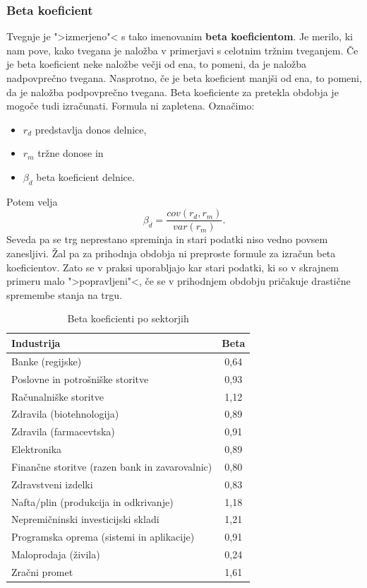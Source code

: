 \documentclass[12pt,a4paper]{amsart}
\theoremstyle{definition} %
\theoremstyle{plain} %
\begin{document}
\subsubsection{Beta koeficient}
Tvegnje je ">izmerjeno"< s tako imenovanim \textbf{beta koeficientom}. Je merilo, ki nam pove,
kako tvegana je naložba v primerjavi s celotnim tržnim tveganjem. Če je beta koeficient neke naložbe
večji od ena, to pomeni, da je naložba nadpovprečno tvegana. Nasprotno, če je beta koeficient 
manjši od ena, to pomeni, da je naložba podpovprečno tvegana. Beta koeficiente za pretekla 
obdobja je mogoče tudi izračunati. Formula ni zapletena. Označimo:
\begin{itemize}
  \item $r_d$ predstavlja donos delnice,
  \item $r_m$ tržne donose in
  \item $\beta_d$ beta koeficient delnice.
\end{itemize}
Potem velja 
$$\beta_d = \frac{cov(r_d, r_m)}{var(r_m)}.$$
Seveda pa se trg neprestano spreminja in stari podatki niso vedno povsem zanesljivi. Žal pa
za prihodnja obdobja ni preproste formule za izračun beta koeficientov. Zato se v praksi 
uporabljajo kar stari podatki, ki so v skrajnem primeru malo ">popravljeni"<, če se v prihodnjem
obdobju pričakuje drastične spremembe stanja na trgu.

\begin{table}[h]
\begin{tabular}{l|c}
\textbf{Industrija}                       & \textbf{Beta} \\ \hline
Banke (regijske)                               & 0,64 \\
Poslovne in potrošniške storitve               & 0,93 \\
Računalniške storitve                          & 1,12 \\
Zdravila (biotehnologija)                      & 0,89 \\
Zdravila (farmacevtska)                        & 0,91 \\
Elektronika                                    & 0,89 \\
Finančne storitve (razen bank in zavarovalnic) & 0,80  \\
Zdravstveni izdelki                            & 0,83 \\
Nafta/plin (produkcija in odkrivanje)          & 1,18 \\
Nepremičninski investicijski skladi            & 1,21 \\
Programska oprema (sistemi in aplikacije)      & 0,91 \\
Maloprodaja (živila)                           & 0,24 \\
Zračni promet                                  & 1,61
\end{tabular}
\caption{Beta koeficienti po sektorjih}
\label{bete}
\end{table}
\end{document}
